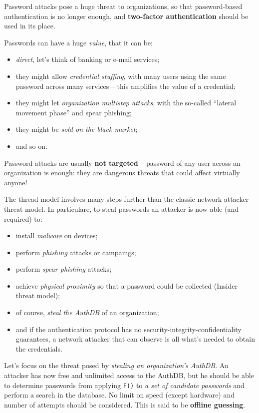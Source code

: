 \documentclass[10pt]{extbook}
\begin{document}
Password attacks pose a huge threat to organizations, so that password\--based
authentication is no longer enough, and \textbf{two\--factor authentication}
should be used in its place.

Passwords can have a huge \emph{value}, that it can be:
\begin{itemize}
    \item \emph{direct}, let's think of banking or e\--mail services;
    \item they might allow \emph{credential stuffing}, with many users using
        the same password across many services -- this amplifies the value of a
        credential;
    \item they might let \emph{organization multistep attacks}, with the
        so\--called ``lateral movement phase'' and spear phishing;
    \item they might be \emph{sold on the black market};
    \item and so on.
\end{itemize}

Password attacks are usually \textbf{not targeted} -- password of any user
across an organization is enough: they are dangerous threats that could affect
virtually anyone!

The thread model involves many steps further than the classic network attacker
threat model. In particulare, to steal passwords an attacker is now able (and
required) to:
\begin{itemize}
    \item install \emph{malware} on devices;
    \item perform \emph{phishing} attacks or campaings;
    \item perform \emph{spear phishing} attacks;
    \item achieve \emph{physical proximity} so that a password could be
        collected (Insider threat model);
    \item of course, \emph{steal the AuthDB} of an organization;
    \item and if the authentication protocol has no
        security\--integrity\--confidentiality guarantees, a network attacker
        that can observe is all what's needed to obtain the credentials.
\end{itemize}

Let's focus on the threat posed by \emph{stealing an organization's AuthDB}. An
attacker has now free and unlimited access to the AuthDB, but he should be able
to determine passwords from applying \texttt{F()} to \emph{a set of candidate
passwords} and perform a search in the database. No limit on speed (except
hardware) and number of attempts should be considered. This is said to be
\textbf{offline guessing}.
\end{document}
